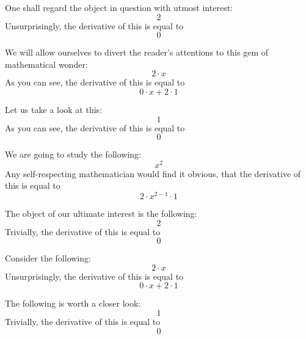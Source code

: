 \documentclass{article}
\begin{document}
One shall regard the object in question with utmost interest:
\begin{equation}
2 
\end{equation}
Unsurprisingly, the derivative of this is equal to
\begin{equation}
0 
\end{equation}

We will allow ourselves to divert the reader's attentions to this gem of mathematical wonder:
\begin{equation}
2 \cdot x 
\end{equation}
As you can see, the derivative of this is equal to
\begin{equation}
0 \cdot x + 2 \cdot 1 
\end{equation}

Let us take a look at this:
\begin{equation}
1 
\end{equation}
As you can see, the derivative of this is equal to
\begin{equation}
0 
\end{equation}

We are going to study the following:
\begin{equation}
x ^{2 } 
\end{equation}
Any self-respecting mathematician would find it obvious, that the derivative of this is equal to
\begin{equation}
2 \cdot x ^{2 - 1 } \cdot 1 
\end{equation}

The object of our ultimate interest is the following:
\begin{equation}
2 
\end{equation}
Trivially, the derivative of this is equal to
\begin{equation}
0 
\end{equation}

Consider the following:
\begin{equation}
2 \cdot x 
\end{equation}
Unsurprisingly, the derivative of this is equal to
\begin{equation}
0 \cdot x + 2 \cdot 1 
\end{equation}

The following is worth a closer look:
\begin{equation}
1 
\end{equation}
Trivially, the derivative of this is equal to
\begin{equation}
0 
\end{equation}
\end{document}
